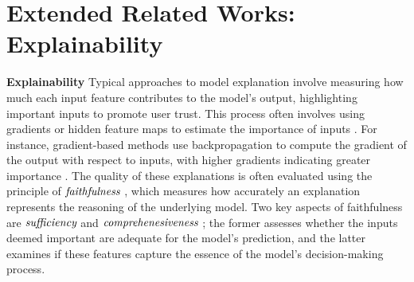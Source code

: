 


\section{Extended Related Works: Explainability}\label{sec:related_works}


\textbf{Explainability} Typical approaches to model explanation involve measuring how much each input feature contributes to the model's output, highlighting important inputs to promote user trust. This process often involves using gradients or hidden feature maps to estimate the importance of inputs \citep{simonyan2014deepinsideconvolutionalnetworks, smilkov2017smoothgradremovingnoiseadding,sundararajan2017axiomaticattributiondeepnetworks, yuan2022explainabilitygraphneuralnetworks}. 
For instance, gradient-based methods use backpropagation to compute the gradient of the output with respect to inputs, with higher gradients indicating greater importance \citep{sundararajan2017axiomaticattributiondeepnetworks, yuan2022explainabilitygraphneuralnetworks}. The quality of these explanations is often evaluated using the principle of $\emph{faithfulness}$ \citep{lyu2024faithfulmodelexplanationnlp, dasgupta2022frameworkevaluatingfaithfulnesslocal, jacovi-goldberg-2020-towards}, which measures how accurately an explanation represents the reasoning of the underlying model. Two key aspects of faithfulness are $\emph{sufficiency}$ and $\emph{comprehenesiveness}$ \citep{deyoung-etal-2020-eraser, yin2022sensitivitystabilitymodelinterpretations}; the former assesses whether the inputs deemed important are adequate for the model's prediction, and the latter examines if these features capture the essence of the model's decision-making process. 


